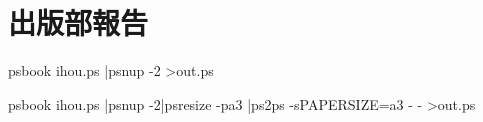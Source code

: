 \chapter{出版部報告}



\begin{listing}
psbook ihou.ps |psnup -2 >out.ps
\end{listing}
\begin{listing}
psbook ihou.ps |psnup -2|psresize -pa3 |ps2ps -sPAPERSIZE=a3 - - >out.ps
\end{listing}